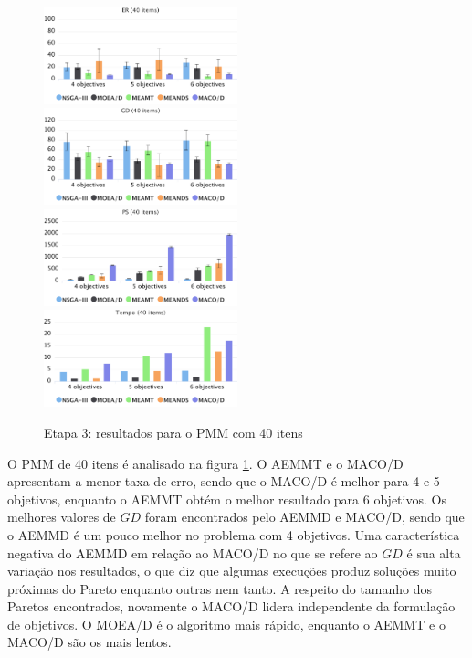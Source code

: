\begin{figure}[!htbp]
	\caption{Etapa 3: resultados para o PMM com 40 itens}
	\label{fig_exp3_pmm_40}
	\includegraphics[width=0.5\textwidth]{cap_experimentos/figs/etapa3/er-mkp-40}
	\includegraphics[width=0.5\textwidth]{cap_experimentos/figs/etapa3/gd-mkp-40}
	\includegraphics[width=0.5\textwidth]{cap_experimentos/figs/etapa3/ps-mkp-40}
	\includegraphics[width=0.5\textwidth]{cap_experimentos/figs/etapa3/time-mkp-40}
\end{figure}

O PMM de 40 itens é analisado na figura \ref{fig_exp3_pmm_40}. O AEMMT e o MACO/D apresentam a menor taxa de erro, sendo que o MACO/D é melhor para 4 e 5 objetivos, enquanto o AEMMT obtém o melhor resultado para 6 objetivos. Os melhores valores de $GD$ foram encontrados pelo AEMMD e MACO/D, sendo que o AEMMD é um pouco melhor no problema com 4 objetivos. Uma característica negativa do AEMMD em relação ao MACO/D no que se refere ao $GD$ é sua alta variação nos resultados, o que diz que algumas execuções produz soluções muito próximas do Pareto enquanto outras nem tanto. A respeito do tamanho dos Paretos encontrados, novamente o MACO/D lidera independente da formulação de objetivos. O MOEA/D é o algoritmo mais rápido, enquanto o AEMMT e o MACO/D são os mais lentos.

